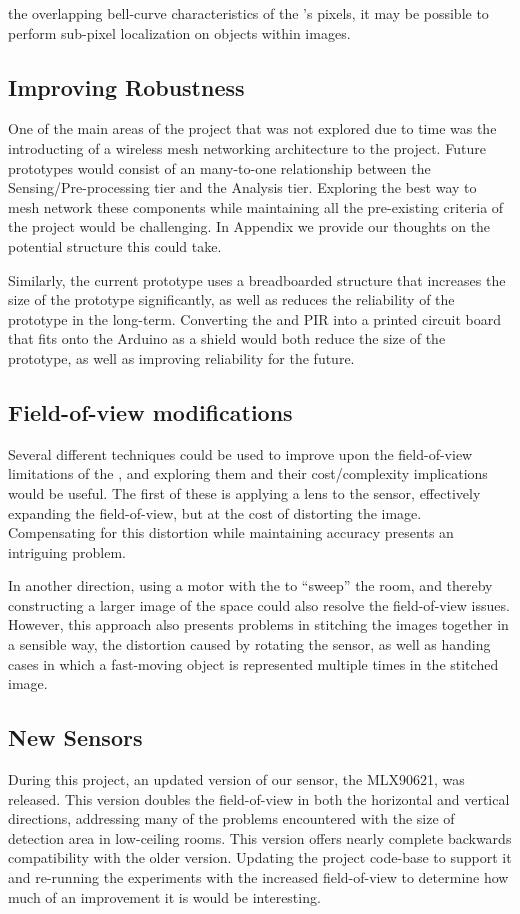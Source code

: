 \documentclass[../thesis/thesis.tex]{subfiles}
\begin{document}
the overlapping bell-curve characteristics of the \mlx's pixels, it may be possible to perform sub-pixel localization on objects within images. %

\subsection{Improving Robustness}
One of the main areas of the project that was not explored due to time was the introducting of a wireless mesh networking architecture to the project. Future prototypes would consist of an many-to-one relationship between the Sensing/Pre-processing tier and the Analysis tier. Exploring the best way to mesh network these components while maintaining all the pre-existing criteria of the project would be challenging. In Appendix  we provide our thoughts on the potential structure this could take.

Similarly, the current prototype uses a breadboarded structure that increases the size of the prototype significantly, as well as reduces the reliability of the prototype in the long-term. Converting the \mlx and PIR into a printed circuit board that fits onto the Arduino as a shield would both reduce the size of the prototype, as well as improving reliability for the future.

\subsection{Field-of-view modifications}
Several different techniques could be used to improve upon the field-of-view limitations of the \mlx, and exploring them and their cost/complexity implications would be useful. The first of these is applying a lens to the sensor, effectively expanding the field-of-view, but at the cost of distorting the image. Compensating for this distortion while maintaining accuracy presents an intriguing problem.

In another direction, using a motor with the \mlx to ``sweep'' the room, and thereby constructing a larger image of the space could also resolve the field-of-view issues. However, this approach also presents problems in stitching the images together in a sensible way, the distortion caused by rotating the sensor, as well as handing cases in which a fast-moving object is represented multiple times in the stitched image.

\subsection{New Sensors}
During this project, an updated version of our sensor, the MLX90621, was released. This version doubles the field-of-view in both the horizontal and vertical directions, addressing many of the problems encountered with the size of detection area in low-ceiling rooms. This version offers nearly complete backwards compatibility with the older version. Updating the project code-base to support it and re-running the experiments with the increased field-of-view to determine how much of an improvement it is would be interesting.
\end{document}
